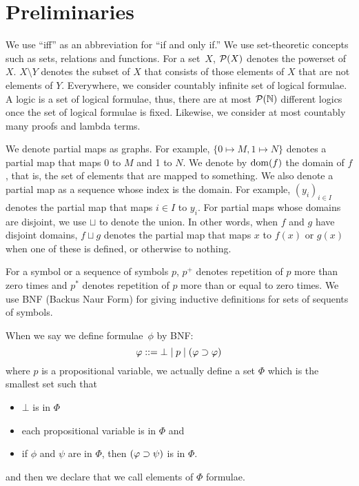  \section{Preliminaries}

  We use ``iff'' as an abbreviation for ``if and only if.''
  We use set-theoretic concepts such as sets, relations and functions.
  For a set~$X$, ${\mathcal P({X})}$ denotes the powerset of $X$.
   $X\setminus Y$ denotes the subset of $X$ that consists of those
   elements of $X$ that are not elements of $Y$.
   Everywhere, we consider countably infinite set of logical formulae.
   A logic is a set of logical formulae, thus, there are at most
   ${\mathcal P({\mathbb N})}$ different logics once the set of logical
   formulae is fixed.
   Likewise, we consider at most countably many proofs and lambda terms.

   We denote partial maps as graphs.
   For example, $\{0\mapsto M, 1\mapsto N\}$ denotes a partial map that
   maps 0 to $M$ and 1 to $N$.
   We denote by $\mathop{\mathrm{dom}}(f)$ the domain of $f$, that is,
   the set of elements that are mapped to something.
   We also denote a partial map as a sequence whose index is the domain.
   For example, $(y_i)_{i\in I}$ denotes the partial map that maps
   $i\in I$ to $y_i$.
   For partial maps whose domains are disjoint, we use $\sqcup$ to
   denote the union.
   In other words, when $f$ and $g$ have disjoint domains, $f\sqcup g$
   denotes the
   partial map that maps $x$ to $f(x)$ or $g(x)$ when one of these is
   defined, or otherwise to nothing.

  For a symbol or a sequence of symbols $p$,
  $p^+$ denotes repetition of $p$ more than zero times and
  $p^*$ denotes repetition of $p$ more than or equal to zero times.
  We use BNF (Backus Naur Form) for giving inductive definitions for sets
  of sequents of symbols.
 \begin{example}[BNF]
  When we say we define formulae~$\phi$ by BNF:
  \[
   \varphi::= \bot \mid p\mid (\varphi\supset\varphi)
  \]
  where $p$ is a propositional variable, we actually define a set $\Phi$
  which is the smallest set such that
  \begin{itemize}
   \item $\bot$ is in $\Phi$
   \item each propositional variable is in $\Phi$ and
   \item if $\phi$ and $\psi$ are in $\Phi$, then $(\varphi\supset\psi)$ is in $\Phi$.
  \end{itemize}
  and then we declare that we call elements of $\Phi$ formulae.
 \end{example}


